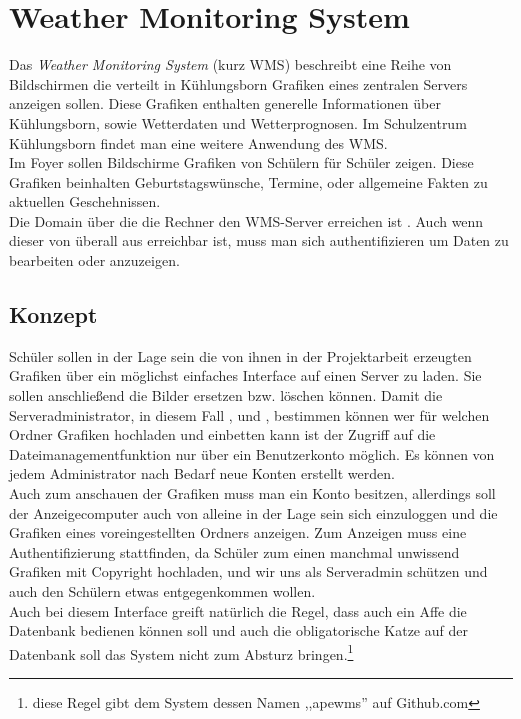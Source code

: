 \section{Weather Monitoring System}
Das \textit{Weather Monitoring System} (kurz WMS) beschreibt eine Reihe von Bildschirmen die verteilt in Kühlungsborn Grafiken eines zentralen Servers anzeigen sollen.
Diese Grafiken enthalten generelle Informationen über Kühlungsborn,
sowie Wetterdaten und Wetterprognosen.
Im Schulzentrum Kühlungsborn findet man eine weitere Anwendung des WMS. \\
Im Foyer sollen Bildschirme Grafiken von Schülern für Schüler zeigen.
Diese Grafiken beinhalten Geburtstagswünsche, Termine, oder allgemeine Fakten zu aktuellen Geschehnissen. \\
Die Domain über die die Rechner den WMS-Server erreichen ist . Auch wenn dieser von überall aus erreichbar ist,
muss man sich authentifizieren um Daten zu bearbeiten oder anzuzeigen.

\subsection{Konzept} %
Schüler sollen in der Lage sein die von ihnen in der Projektarbeit erzeugten Grafiken über ein möglichst einfaches Interface auf einen Server zu laden.
Sie sollen anschließend die Bilder ersetzen bzw. löschen können.
Damit die Serveradministrator, in diesem Fall \sw , \mb und \re ,
bestimmen können wer für welchen Ordner Grafiken hochladen und einbetten kann ist der Zugriff auf die Dateimanagementfunktion nur über ein Benutzerkonto möglich.
Es können von jedem Administrator nach Bedarf neue Konten erstellt werden. \\
Auch zum anschauen der Grafiken muss man ein Konto besitzen,
allerdings soll der Anzeigecomputer auch von alleine in der Lage sein sich einzuloggen und die Grafiken eines voreingestellten Ordners anzeigen.
Zum Anzeigen muss eine Authentifizierung stattfinden, da Schüler zum einen manchmal unwissend Grafiken mit Copyright hochladen,
und wir uns als Serveradmin schützen und auch den Schülern etwas entgegenkommen wollen. \\
Auch bei diesem Interface greift natürlich die Regel,
dass auch ein Affe die Datenbank bedienen können soll und auch die obligatorische Katze auf der Datenbank soll das System nicht zum Absturz bringen.\footnote{diese Regel gibt dem System dessen Namen ,,apewms'' auf Github.com}

